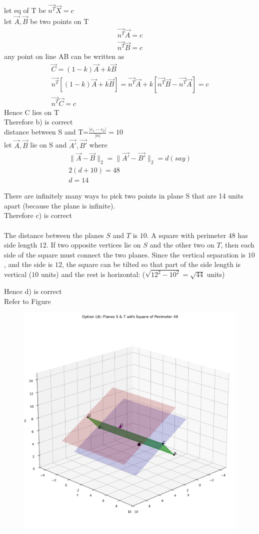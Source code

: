\documentclass[journal]{IEEEtran}
\begin{document}
let eq of T be $\vec{n^T}\vec{X}=c$\\
let $\vec{A},\vec{B}$ be two points on T\\
\begin{align}
    \vec{n^T}\vec{A}=c\\
    \vec{n^T}\vec{B}=c
\end{align}
any point on line AB can be written as
\begin{align}
    \vec{C}=(1-k)\vec{A}+k\vec{B}\\
    \vec{n^T}[(1-k)\vec{A}+k\vec{B}]
   = \vec{n^T}\vec{A}+k[\vec{n^T}\vec{B}-\vec{n^T}\vec{A}]
   =c\\
   \vec{n^T}\vec{C}=c
\end{align}
Hence C lies on T \\
Therefore b) is correct\\
distance between S and T=$\frac{\lvert c_1 - c_2 \rvert}{|n|}
=10$\\
let $\vec{A},\vec{B}$ lie on S and $\vec{A'},\vec{B'}$
where 
\begin{align}
 \|\vec{A}-\vec{B}\|_2=\|\vec{A'}-\vec{B'}\|_2=d(say)\\
 2(d+10)=48\\
 d=14
\end{align}

There are infinitely many ways to pick two points in plane 
S that are 14 units apart (because the plane is infinite).\\
Therefore c) is correct\\
\\

The distance between the planes $S$ and $T$ is $10$. A square with perimeter $48$ has side length $12$.  
If two opposite vertices lie on $S$ and the other two on $T$, then each side of the square must connect the two planes.  
Since the vertical separation is $10$, and the side is $12$, the square can be tilted so that part of the side length is vertical ($10$ units) and the rest is horizontal: ($\sqrt{12^2 - 10^2} = \sqrt{44}$ units)


Hence d) is correct\\
Refer to Figure

\begin{figure}[H]
\begin{center}
\includegraphics[width=0.6\columnwidth]{figs/graph5a.png}
\end{center}
\caption{}
\label{fig:Fig}
\end{figure}
\end{document}
